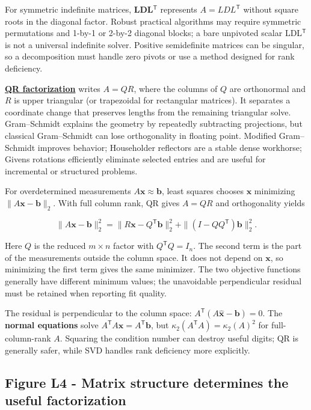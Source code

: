 For symmetric indefinite matrices, \textbf{LDL\(^\mathsf T\)} represents \(A=LDL^\mathsf T\) without square roots in the diagonal factor. Robust practical algorithms may require symmetric permutations and 1-by-1 or 2-by-2 diagonal blocks; a bare unpivoted scalar LDL\(^\mathsf T\) is not a universal indefinite solver. Positive semidefinite matrices can be singular, so a decomposition must handle zero pivots or use a method designed for rank deficiency.

\textbf{\hyperref[01-foundations-i-ch020-reflections-and-plane-rotations-build-qr-without-losing-lengths]{QR factorization}} writes \(A=QR\), where the columns of \(Q\) are orthonormal and \(R\) is upper triangular (or trapezoidal for rectangular matrices). It separates a coordinate change that preserves lengths from the remaining triangular solve. Gram--Schmidt explains the geometry by repeatedly subtracting projections, but classical Gram--Schmidt can lose orthogonality in floating point. Modified Gram--Schmidt improves behavior; Householder reflectors are a stable dense workhorse; Givens rotations efficiently eliminate selected entries and are useful for incremental or structured problems.

For overdetermined measurements \(A\mathbf x\approx\mathbf b\), least squares chooses \(\mathbf x\) minimizing \(\|A\mathbf x-\mathbf b\|_2\). With full column rank, QR gives \(A=QR\) and orthogonality yields

\[
\|A\mathbf x-\mathbf b\|_2^2
=\|R\mathbf x-Q^\mathsf T\mathbf b\|_2^2
+\|(I-QQ^\mathsf T)\mathbf b\|_2^2.
\]

Here \(Q\) is the reduced \(m\times n\) factor with \(Q^\mathsf TQ=I_n\). The second term is the part of the measurements outside the column space. It does not depend on \(\mathbf x\), so minimizing the first term gives the same minimizer. The two objective functions generally have different minimum values; the unavoidable perpendicular residual must be retained when reporting fit quality.

The residual is perpendicular to the column space: \(A^\mathsf T(A\widehat{\mathbf x}-\mathbf b)=0\). The \textbf{normal equations} solve \(A^\mathsf T A\mathbf x=A^\mathsf T\mathbf b\), but \(\kappa_2(A^\mathsf T A)=\kappa_2(A)^2\) for full-column-rank \(A\). Squaring the condition number can destroy useful digits; QR is generally safer, while SVD handles rank deficiency more explicitly.

\subsection{Figure L4 - Matrix structure determines the useful factorization}\label{01-foundations-i-ch020-figure-l4---matrix-structure-determines-the-useful-factorization}

